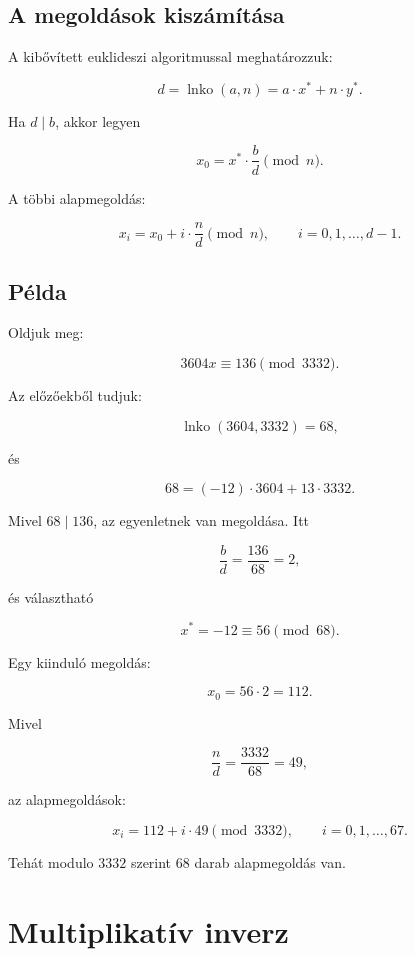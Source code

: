 \begin{center}

\end{center}

\subsection{A megoldások kiszámítása}

A kibővített euklideszi algoritmussal meghatározzuk:

\[
d=\operatorname{lnko}(a,n)=a\cdot x^{*}+n\cdot y^{*}.
\]

Ha $d\mid b$, akkor legyen

\[
x_0=x^{*}\cdot\frac{b}{d}\pmod n.
\]

A többi alapmegoldás:

\[
x_i=x_0+i\cdot\frac{n}{d}\pmod n,\qquad i=0,1,\ldots,d-1.
\]

\subsection{Példa}

Oldjuk meg:

\[
3604x\equiv136\pmod{3332}.
\]

Az előzőekből tudjuk:

\[
\operatorname{lnko}(3604,3332)=68,
\]

és

\[
68=(-12)\cdot3604+13\cdot3332.
\]

Mivel $68\mid136$, az egyenletnek van megoldása. Itt

\[
\frac{b}{d}=\frac{136}{68}=2,
\]

és választható

\[
x^{*}=-12\equiv56\pmod{68}.
\]

Egy kiinduló megoldás:

\[
x_0=56\cdot2=112.
\]

Mivel

\[
\frac{n}{d}=\frac{3332}{68}=49,
\]

az alapmegoldások:

\[
x_i=112+i\cdot49\pmod{3332},\qquad i=0,1,\ldots,67.
\]

Tehát modulo $3332$ szerint $68$ darab alapmegoldás van.

\section{Multiplikatív inverz}

